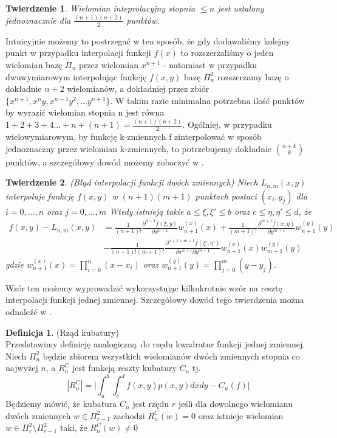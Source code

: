 \documentclass[10pt,wide]{mwart}
\newtheorem{tw}{Twierdzenie}
\theoremstyle{definition}
\newtheorem{df}{Definicja}
\begin{document}
\begin{tw}
  Wielomian inteprolacyjny stopnia \(\leq n\) jest ustalony jednoznacznie dla \(\frac{(n+1)(n+2)}{2}\) punktów.
\end{tw}
Intuicyjnie możemy to postrzegać w ten sposób, że gdy dodawaliśmy kolejny punkt w przypadku interpolacji funkcji \(f(x)\) to rozszerzaliśmy o jeden wielomian bazę \(\Pi_n\) przez wielomian \(x^{n+1}\)
- natomiast w przypadku dwuwymiarowym interpolując funkcję \(f(x,y)\) bazę \(\Pi_n^2\) rozszerzamy bazę o dokładnie \(n+2\) wielomianów, a dokładniej przez zbiór \(\{x^{n+1}, x^{n}y, x^{n-1}y^2, ... y^{n+1}\}\).
W takim razie minimalna potrzebna ilość punktów by wyrazić wielomian stopnia n jest równa \(1 + 2 + 3 + 4 ... + n + (n+1) = \frac{(n+1)(n+2)}{2}\).
Ogólniej, w przypadku wielowymiarowym, by funkcję k-zmiennych f zinterpolować w sposób jednoznaczny przez wielomian k-zmiennych, to potrzebujemy dokładnie \({n+k \choose k}\) punktów,
 a szczegółowy dowód możemy zobaczyć w \cite{PO}.
\begin{tw} (Błąd interpolacji funkcji dwóch zmiennych)
  Niech \(L_{n,m}(x,y)\) interpoluje funkcję \(f(x,y)\) w \((n+1)(m+1)\) punktach postaci \((x_i, y_j)\) dla \(i = 0,...,n\) oraz \(j = 0,...,m\)
  Wtedy istnieją takie \( a \leq \xi,\xi' \leq b\) oraz \(c \leq \eta,\eta' \leq d\), że
  \begin{equation*}
    \begin{split}
  f(x,y) - L_{n,m}(x,y) & = \frac{1}{(n+1)!}\frac{\partial^{n+1} f(\xi, y)}{\partial x^{n+1}}w_{n+1}^{(x)}(x) + \frac{1}{(m+1)!}\frac{\partial^{m+1} f(x, \eta)}{\partial y^{m+1}}w_{n+1}^{(y)}(y)\\
  & - \frac{1}{(n+1)!(m+1)!}\frac{\partial^{n+1 + m+1} f(\xi',\eta') }{\partial x^{n+1} \partial y^{m+1}}w_{n+1}^{(x)}(x)w_{m+1}^{(y)}(y)
  \end{split}
\end{equation*}
gdzie \(w_{n+1}^{(x)}(x) = \prod_{i=0}^{n}(x-x_i)\) oraz \(w_{n+1}^{(y)}(y) = \prod_{j=0}^{m}(y-y_j)\).
\end{tw}
Wzór ten możemy wyprowadzić wykorzystując kilkukrotnie wzór na resztę interpolacji funkcji jednej zmiennej. Szczegółowy dowód tego twierdzenia można odnaleźć w \cite[\S6.6]{IK}.
\begin{df}(Rząd kubatury) \\
  Przedstawimy definicję analogiczną do rzędu kwadratur funkcji jednej zmiennej.
  Niech \(\Pi_{n}^2\) będzie zbiorem wszystkich wielomianów dwóch zmiennych stopnia co najwyżej \(n\), a \(R_n^C\) jest funkcją reszty kubatury \(C_n\) tj.
  \begin{equation*}
    |R_n^C| = \Big|\int_a^b \int_c^d f(x,y) p(x,y) dx dy - C_n(f)\Big|
  \end{equation*}
  Będziemy mówić, że kubatura \(C_n\) jest rzędu \(r\) jeśli
  dla dowolnego wielomianu dwóch zmiennych \(w \in \Pi_{r-1}^2\) zachodzi \(R_n^C(w) = 0 \)
  oraz istnieje wielomian \(w \in \Pi_{r}^2 \setminus \Pi_{r-1}^2\) taki, że \(R_n^C(w) \neq 0\)


\end{df}
\end{document}
